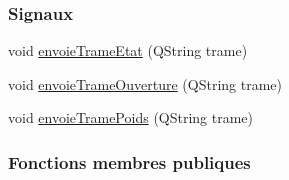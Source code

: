 \subsubsection*{Signaux}
\begin{DoxyCompactItemize}
\item 
void \hyperlink{class_communication_a8beb7417ede75d0056b06788ef72d21b}{envoie\+Trame\+Etat} (Q\+String trame)
\item 
void \hyperlink{class_communication_a9fb098f5b5cb8931efefc58984529119}{envoie\+Trame\+Ouverture} (Q\+String trame)
\item 
void \hyperlink{class_communication_aaea5653e8aa1b50b4774caf65db21409}{envoie\+Trame\+Poids} (Q\+String trame)
\end{DoxyCompactItemize}
\subsubsection*{Fonctions membres publiques}
